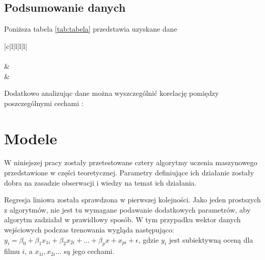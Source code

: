\subsection{Podsumowanie danych}
Poniższa tabela \ref{tab:tabela} przedstawia uzyskane dane 


\begin{table}[!htbp]
\centering
\begin{tabular}{|c|l|l|l|l|}
\hline
{} \\ \hline
{} \\ \hline
{} &  \\ \hline
{} &  \\ \hline
\end{tabular}
\caption{Podsumowanie przygotowania danych}
\label{tab:tabela}
\end{table}

Dodatkowo analizując dane można wyszczególnić korelację pomiędzy poszczególnymi cechami : 



\section{Modele }
\label{cha:drugiDokument}
W niniejszej pracy zostały przetestowane cztery algorytmy uczenia maszynowego przedstawione w części teoretycznej. Parametry definiujące ich działanie zostały dobra na zasadzie obserwacji i wiedzy na temat ich działania.\par

Regresja liniowa została sprawdzona w pierwszej kolejności. Jako jeden prostszych z algorytmów, nie jest tu wymagane podawanie dodatkowych parametrów, aby algorytm zadziałał w prawidłowy sposób. W tym przypadku wektor danych wejściowych podczas trenowania wygląda następująco: $y_i = \beta_0 + \beta_1 x_{1i} + \beta_2 x_{2i} + ... + \beta_p x+x_{pi} + \epsilon $, gdzie $y_i$ jest subiektywną oceną dla filmu $i$, a $x_{1i}, x_{2i}...$ są jego cechami. \par

